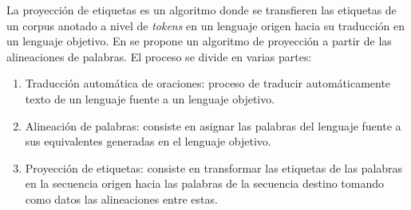 \documentclass[a4paper,11pt,twocolumn,twoside]{article}
\begin{document}

La proyección de etiquetas es un algoritmo donde se 
transfieren las etiquetas de un corpus anotado a nivel de \textit{tokens} en un lenguaje origen hacia su traducción en un
lenguaje objetivo. En \cite{eger2018cross} se propone un algoritmo de proyección a partir de las alineaciones de 
palabras. El proceso se divide en varias partes:

\begin{enumerate}
	\item Traducción automática de oraciones: proceso de
	traducir automáticamente texto de un lenguaje fuente a un lenguaje objetivo.
	\item Alineación de palabras: consiste en asignar las palabras del lenguaje fuente
	a sus equivalentes generadas en el lenguaje objetivo.
	\item Proyección de etiquetas: consiste en transformar las etiquetas de las palabras en la secuencia origen
	hacia las palabras de la secuencia destino tomando como datos las alineaciones entre estas.
\end{enumerate}


\end{document}

